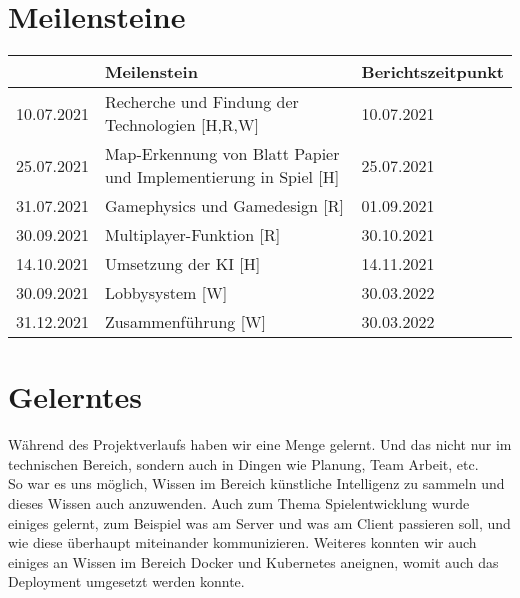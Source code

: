 \section{Meilensteine}
\begin{table}[H]
    \begin{tabular}{|l|l|l|}
    \hline
    \multicolumn{1}{|r|}{\textit{}} & \textbf{Meilenstein}                                                & \textbf{Berichtszeitpunkt} \\ \hline
    10.07.2021                      & Recherche und Findung der Technologien {[}H,R,W{]}                  & 10.07.2021                 \\ \hline
    25.07.2021                      & Map-Erkennung von Blatt Papier und Implementierung in Spiel {[}H{]} & 25.07.2021                 \\ \hline
    31.07.2021                      & Gamephysics und Gamedesign {[}R{]}                                  & 01.09.2021                 \\ \hline
    30.09.2021                      & Multiplayer-Funktion {[}R{]}                                        & 30.10.2021                 \\ \hline
    14.10.2021                      & Umsetzung der KI {[}H{]}                                            & 14.11.2021                 \\ \hline
    30.09.2021                      & Lobbysystem {[}W{]}                                                 & 30.03.2022                 \\ \hline
    31.12.2021                      & Zusammenführung {[}W{]}                                             & 30.03.2022                 \\ \hline
    \end{tabular}
    \end{table}
\section{Gelerntes}
Während des Projektverlaufs haben wir eine Menge gelernt. Und das nicht nur im technischen
Bereich, sondern auch in Dingen wie Planung, Team Arbeit, etc. \\
So war es uns möglich, Wissen im Bereich künstliche Intelligenz zu sammeln und dieses Wissen auch anzuwenden. 
Auch zum Thema Spielentwicklung wurde einiges gelernt, zum Beispiel was am Server und was am Client passieren soll, und wie diese überhaupt miteinander kommunizieren.
Weiteres konnten wir auch einiges an Wissen im Bereich Docker und Kubernetes aneignen, womit auch das Deployment umgesetzt werden konnte.

